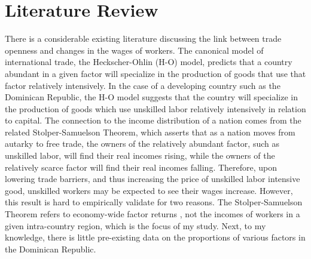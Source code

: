 \documentclass[12pt]{article}
\begin{document}

\vspace{-10pt}
\section{Literature Review}
\label{sec:Litreview}
There is a considerable existing literature discussing the link between trade openness
and changes in the wages of workers.
The canonical model of international trade, the Heckscher-Ohlin (H-O) model, 
predicts that a country abundant in a given factor will specialize 
in the production of goods that use that factor relatively intensively.
In the case of a developing country such as the Dominican Republic, the 
H-O model suggests that the country will specialize in the production of goods
which use unskilled labor relatively intensively in relation to capital. 
The connection to the income
distribution of a nation comes from the related Stolper-Samuelson Theorem,
which asserts that as a nation moves from autarky to free trade, the owners of the relatively
abundant factor, such as unskilled labor, will find their real incomes rising, while the owners of
the relatively scarce factor will find their real incomes falling. 
Therefore, upon lowering trade barriers, and thus increasing the price of unskilled labor intensive
good, unskilled workers may be expected to see their wages
increase.
However, this result is hard to empirically validate for two reasons. The Stolper-Samuelson Theorem
refers to economy-wide factor returns \citep{goldberg}, not the incomes of workers in a given intra-country
region, which is the focus of my study. Next, to my knowledge, there is little pre-existing data on the 
proportions of various factors in the Dominican Republic.

\end{document}

